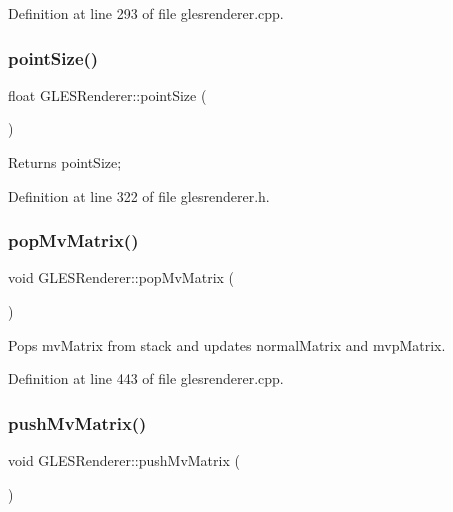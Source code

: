 Definition at line 293 of file glesrenderer.\+cpp.

\mbox{\label{class_g_l_e_s_renderer_a2ba82f565d0a34259614448407cdad11}} 
\subsubsection{\texorpdfstring{pointSize()}{pointSize()}}
{\footnotesize\ttfamily float G\+L\+E\+S\+Renderer\+::point\+Size (\begin{DoxyParamCaption}{ }\end{DoxyParamCaption})\hspace{0.3cm}{\ttfamily [inline]}}

Returns point\+Size; 

Definition at line 322 of file glesrenderer.\+h.

\mbox{\label{class_g_l_e_s_renderer_a93ddfbce8f107b0cbc41b2854855202d}} 
\subsubsection{\texorpdfstring{popMvMatrix()}{popMvMatrix()}}
{\footnotesize\ttfamily void G\+L\+E\+S\+Renderer\+::pop\+Mv\+Matrix (\begin{DoxyParamCaption}{ }\end{DoxyParamCaption})}

Pops mv\+Matrix from stack and updates normal\+Matrix and mvp\+Matrix. 

Definition at line 443 of file glesrenderer.\+cpp.

\mbox{\label{class_g_l_e_s_renderer_a712dddd10f14f80a003a347ff1aa1666}} 
\subsubsection{\texorpdfstring{pushMvMatrix()}{pushMvMatrix()}}
{\footnotesize\ttfamily void G\+L\+E\+S\+Renderer\+::push\+Mv\+Matrix (\begin{DoxyParamCaption}{ }\end{DoxyParamCaption})\hspace{0.3cm}{\ttfamily [inline]}}

